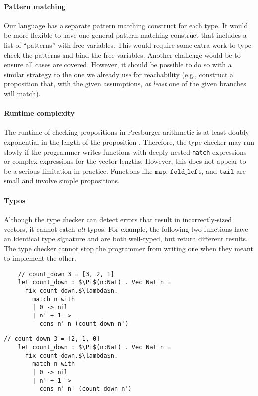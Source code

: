 \documentclass[acmsmall,nonacm]{acmart}
\begin{document}
\paragraph{Pattern matching}
Our language has a separate pattern matching construct for each type.
It would be more flexible to have one general pattern matching construct that includes a list of ``patterns'' with free variables.
This would require some extra work to type check the patterns and bind the free variables.
Another challenge would be to ensure all cases are covered.
However, it should be possible to do so with a similar strategy to the one we already use for reachability (e.g., construct a proposition that, with the given assumptions, \emph{at least} one of the given branches will match).

\paragraph{Runtime complexity}
The runtime of checking propositions in Presburger arithmetic is at least doubly exponential in the length of the proposition \cite{fischer-rabin-1998}.
Therefore, the type checker may run slowly if the programmer writes functions with deeply-nested \texttt{match} expressions or complex expressions for the vector lengths.
However, this does not appear to be a serious limitation in practice.
Functions like $\texttt{map}$, $\texttt{fold\_left}$, and $\texttt{tail}$ are small and involve simple propositions.

\paragraph{Typos}
Although the type checker can detect errors that result in incorrectly-sized vectors, it cannot catch \emph{all} typos.
For example, the following two functions have an identical type signature and are both well-typed, but return different results.
The type checker cannot stop the programmer from writing one when they meant to implement the other.

\begin{multicols}{2}
\begin{lstlisting}
    // count_down 3 = [3, 2, 1]
    let count_down : $\Pi$(n:Nat) . Vec Nat n =
      fix count_down.$\lambda$n.
        match n with
        | 0 -> nil
        | n' + 1 ->
          cons n' n (count_down n')
\end{lstlisting}
\begin{lstlisting}[numbers=none]
    // count_down 3 = [2, 1, 0]
    let count_down : $\Pi$(n:Nat) . Vec Nat n =
      fix count_down.$\lambda$n.
        match n with
        | 0 -> nil
        | n' + 1 ->
          cons n' n' (count_down n')
\end{lstlisting}
\end{multicols}
\end{document}
